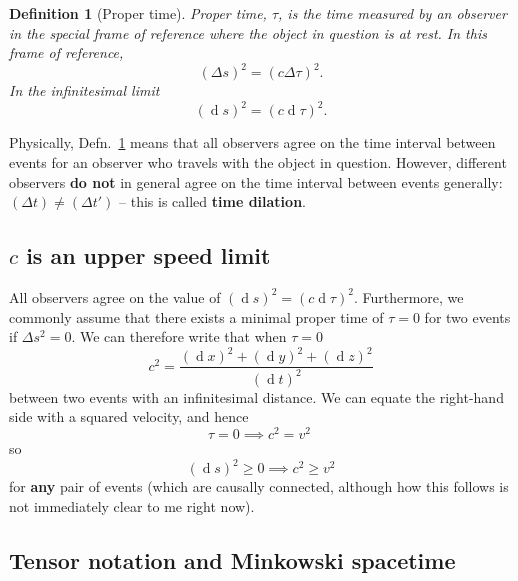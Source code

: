 \documentclass[11pt]{article}
\numberwithin{equation}{section}
\renewcommand{\d}[1]{\ensuremath{\operatorname{d}\!{#1}}}
\newtheorem{defn}{Definition}[section]
\begin{document}
\begin{defn}[Proper time] \label{defn:proper-time}
Proper time, $\tau$, is the time measured by an observer in the special frame of reference where the object in question is at rest. In this frame of reference,
\begin{equation}
(\Delta s)^2 = (c \Delta \tau)^2.
\end{equation}
In the infinitesimal limit
\begin{equation}
(\d s)^2 = (c \d \tau)^2.
\end{equation}
\end{defn}
Physically, Defn.~\ref{defn:proper-time} means that all observers agree on the time interval between events for an observer who travels with the object in question. However, different observers \textbf{do not} in general agree on the time interval between events generally: $(\Delta t) \neq (\Delta t')$ -- this is called \textbf{time dilation}. 

\subsection{$c$ is an upper speed limit}
All observers agree on the value of $(\d s)^2=(c \d \tau)^2$. Furthermore, we commonly assume that there exists a minimal proper time of $\tau = 0$ for two events if $\Delta s^2 = 0$. We can therefore write that when $\tau = 0$
\begin{equation}
c^2 = \frac{(\d x)^2 + (\d y)^2 + (\d z)^2}{(\d t)^2}
\end{equation}
between two events with an infinitesimal distance. We can equate the right-hand side with a squared velocity, and hence
\begin{equation}
\tau = 0 \implies c^2 = v^2\ 
\end{equation}
so
\begin{equation}
(\d s)^2 \geq 0 \implies c^2 \geq v^2
\end{equation}
for \textbf{any} pair of events (which are causally connected, although how this follows is not immediately clear to me right now). 

\subsection{Tensor notation and Minkowski spacetime}
\end{document}
